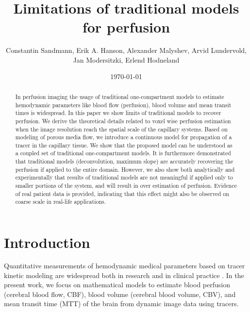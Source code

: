 \documentclass[journal,twocolumn]{IEEEtran}
\title{Limitations of traditional models for perfusion}
\author{Constantin Sandmann, Erik A. Hanson, Alexander Malyshev,  Arvid Lundervold, Jan Modersitzki, Erlend Hodneland }
\date{\today}
\begin{document}
	\maketitle

	\begin{abstract}
		In perfusion imaging the usage of traditional one-compartment models to estimate hemodynamic parameters like blood flow (perfusion), blood volume and mean transit times is widespread. In this paper we show limits of traditional models to recover perfusion. We derive the theoretical details related to voxel wise perfusion estimation when the image resolution reach the spatial scale of the capillary systems.  %
Based on modeling of porous media flow, we introduce a continuous model for propagation of a tracer in the capillary tissue. We show that the proposed model can be understood as a coupled set of traditional one-compartment models. It is furthermore demonstrated that traditional models (deconvolution, maximum slope) are accurately recovering the perfusion if applied to the entire domain. However, we also show both analytically and experimentally that results of traditional models are not meaningful if applied only to smaller portions of the system, and will result in over estimation of perfusion. Evidence of real patient data is provided, indicating that this effect might also be observed on coarse scale in real-life applications. 
	\end{abstract}

	\section{Introduction}
	
	Quantitative measurements of hemodynamic medical parameters based on tracer kinetic modeling are widespread both in research and in clinical practice \cite{sourbron13,Feng2013,Chen2011}. 
	In the present work, we focus on mathematical models to estimate blood perfusion (cerebral blood flow, CBF), blood volume (cerebral blood volume, CBV), and mean transit time (MTT) of the brain from dynamic image data using tracers. 
\end{document}
